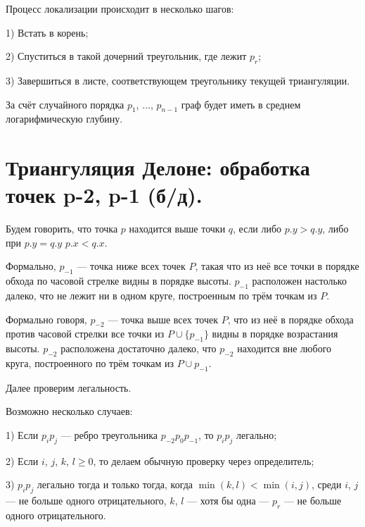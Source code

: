 Процесс локализации происходит в несколько шагов:

1) Встать в корень;

2) Спуститься в такой дочерний треугольник, где лежит $p_r$;

3) Завершиться в листе, соответствующем треугольнику текущей триангуляции.

За счёт случайного порядка $p_1$, $\dots$, $p_{n - 1}$ граф будет иметь в среднем логарифмическую глубину.

\section{Триангуляция Делоне: обработка точек p-2, p-1 (б/д).}

Будем говорить, что точка $p$ находится выше точки $q$, если либо $p.y > q.y$, либо при $p.y = q.y$ $p.x < q.x$.

Формально, $p_{-1}$ — точка ниже всех точек $P$, такая что из неё все точки в порядке обхода по часовой стрелке видны в порядке высоты. $p_{-1}$ расположен настолько далеко, что не лежит ни в одном круге, построенным по трём точкам из $P$. 

Формально говоря, $p_{-2}$ — точка выше всех точек $P$, что из неё в порядке обхода против часовой стрелки все точки из $P \cup \{  p_{-1} \}$ видны в порядке возрастания высоты. $p_{-2}$ расположена достаточно далеко, что $p_{-2}$ находится вне любого круга, построенного по трём точкам из $P \cup p_{-1}$.

Далее проверим легальность.

Возможно несколько случаев:

1) Если $p_i p_j$ — ребро треугольника $p_{-2} p_0 p_{-1}$, то $p_i p_j$ легально;

2) Если $i$, $j$, $k$, $l \geqslant 0$, то делаем обычную проверку через определитель;

3) $p_i p_j$ легально тогда и только тогда, когда $\min(k, l) < \min (i, j)$, среди $i$, $j$ — не больше одного отрицательного, $k$, $l$ — хотя бы одна — $p_r$ — не больше одного отрицательного.